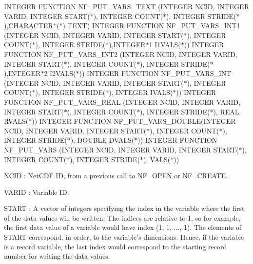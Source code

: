 I\+N\+T\+E\+G\+ER F\+U\+N\+C\+T\+I\+ON N\+F\+\_\+\+P\+U\+T\+\_\+\+V\+A\+R\+S\+\_\+\+T\+E\+XT (I\+N\+T\+E\+G\+ER N\+C\+ID, I\+N\+T\+E\+G\+ER V\+A\+R\+ID, I\+N\+T\+E\+G\+ER S\+T\+A\+R\+T($\ast$), I\+N\+T\+E\+G\+ER C\+O\+U\+N\+T($\ast$), I\+N\+T\+E\+G\+ER S\+T\+R\+I\+D\+E($\ast$),C\+H\+A\+R\+A\+C\+T\+E\+R$\ast$($\ast$) T\+E\+XT) I\+N\+T\+E\+G\+ER F\+U\+N\+C\+T\+I\+ON N\+F\+\_\+\+P\+U\+T\+\_\+\+V\+A\+R\+S\+\_\+\+I\+N\+T1 (I\+N\+T\+E\+G\+ER N\+C\+ID, I\+N\+T\+E\+G\+ER V\+A\+R\+ID, I\+N\+T\+E\+G\+ER S\+T\+A\+R\+T($\ast$), I\+N\+T\+E\+G\+ER C\+O\+U\+N\+T($\ast$), I\+N\+T\+E\+G\+ER S\+T\+R\+I\+D\+E($\ast$),I\+N\+T\+E\+G\+E\+R$\ast$1 I1\+V\+A\+L\+S($\ast$)) I\+N\+T\+E\+G\+ER F\+U\+N\+C\+T\+I\+ON N\+F\+\_\+\+P\+U\+T\+\_\+\+V\+A\+R\+S\+\_\+\+I\+N\+T2 (I\+N\+T\+E\+G\+ER N\+C\+ID, I\+N\+T\+E\+G\+ER V\+A\+R\+ID, I\+N\+T\+E\+G\+ER S\+T\+A\+R\+T($\ast$), I\+N\+T\+E\+G\+ER C\+O\+U\+N\+T($\ast$), I\+N\+T\+E\+G\+ER S\+T\+R\+I\+D\+E($\ast$),I\+N\+T\+E\+G\+E\+R$\ast$2 I2\+V\+A\+L\+S($\ast$)) I\+N\+T\+E\+G\+ER F\+U\+N\+C\+T\+I\+ON N\+F\+\_\+\+P\+U\+T\+\_\+\+V\+A\+R\+S\+\_\+\+I\+NT (I\+N\+T\+E\+G\+ER N\+C\+ID, I\+N\+T\+E\+G\+ER V\+A\+R\+ID, I\+N\+T\+E\+G\+ER S\+T\+A\+R\+T($\ast$), I\+N\+T\+E\+G\+ER C\+O\+U\+N\+T($\ast$), I\+N\+T\+E\+G\+ER S\+T\+R\+I\+D\+E($\ast$), I\+N\+T\+E\+G\+ER I\+V\+A\+L\+S($\ast$)) I\+N\+T\+E\+G\+ER F\+U\+N\+C\+T\+I\+ON N\+F\+\_\+\+P\+U\+T\+\_\+\+V\+A\+R\+S\+\_\+\+R\+E\+AL (I\+N\+T\+E\+G\+ER N\+C\+ID, I\+N\+T\+E\+G\+ER V\+A\+R\+ID, I\+N\+T\+E\+G\+ER S\+T\+A\+R\+T($\ast$), I\+N\+T\+E\+G\+ER C\+O\+U\+N\+T($\ast$), I\+N\+T\+E\+G\+ER S\+T\+R\+I\+D\+E($\ast$), R\+E\+AL R\+V\+A\+L\+S($\ast$)) I\+N\+T\+E\+G\+ER F\+U\+N\+C\+T\+I\+ON N\+F\+\_\+\+P\+U\+T\+\_\+\+V\+A\+R\+S\+\_\+\+D\+O\+U\+B\+LE(I\+N\+T\+E\+G\+ER N\+C\+ID, I\+N\+T\+E\+G\+ER V\+A\+R\+ID, I\+N\+T\+E\+G\+ER S\+T\+A\+R\+T($\ast$), I\+N\+T\+E\+G\+ER C\+O\+U\+N\+T($\ast$), I\+N\+T\+E\+G\+ER S\+T\+R\+I\+D\+E($\ast$), D\+O\+U\+B\+LE D\+V\+A\+L\+S($\ast$)) I\+N\+T\+E\+G\+ER F\+U\+N\+C\+T\+I\+ON N\+F\+\_\+\+P\+U\+T\+\_\+\+V\+A\+RS (I\+N\+T\+E\+G\+ER N\+C\+ID, I\+N\+T\+E\+G\+ER V\+A\+R\+ID, I\+N\+T\+E\+G\+ER S\+T\+A\+R\+T($\ast$), I\+N\+T\+E\+G\+ER C\+O\+U\+N\+T($\ast$), I\+N\+T\+E\+G\+ER S\+T\+R\+I\+D\+E($\ast$), V\+A\+L\+S($\ast$))

{\ttfamily N\+C\+ID} \+: Net\+C\+DF ID, from a previous call to N\+F\+\_\+\+O\+P\+EN or N\+F\+\_\+\+C\+R\+E\+A\+TE.

{\ttfamily V\+A\+R\+ID} \+: Variable ID.

{\ttfamily S\+T\+A\+RT} \+: A vector of integers specifying the index in the variable where the first of the data values will be written. The indices are relative to 1, so for example, the first data value of a variable would have index (1, 1, ..., 1). The elements of S\+T\+A\+RT correspond, in order, to the variable’s dimensions. Hence, if the variable is a record variable, the last index would correspond to the starting record number for writing the data values.

